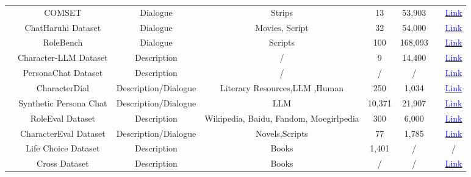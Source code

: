 \begin{table}[!htp]
{{\begin{tabular}{c|c|c|c|c|c|c|c}
\cline{2-8}
   & COMSET & Dialogue & Strips & 13 & 53,903 & \cite{agrawal-etal-2023-multimodal} & \href{https://github.com/dair-iitd/MPdialog}{\textcolor{blue}{Link}} \\
\cline{2-8}
   & ChatHaruhi Dataset & Dialogue & Movies, Script & 32 & 54,000 & \cite{li2023chatharuhirevivinganimecharacter} & \href{https://github.com/LC1332/Chat-Haruhi-Suzumiya}{\textcolor{blue}{Link}} \\
\cline{2-8}
   & RoleBench & Dialogue & Scripts & 100 & 168,093 & \cite{wang2024rolellmbenchmarkingelicitingenhancing} & \href{https://github.com/InteractiveNLP-Team/RoleLLM-public}{\textcolor{blue}{Link}} \\
\cline{2-8}
   & Character-LLM Dataset & Description & /  & 9 & 14,400 & \cite{shao2023characterllmtrainableagentroleplaying} & \href{https://github.com/choosewhatulike/trainable-agents}{\textcolor{blue}{Link}} \\
\cline{2-8}
   & PersonaChat Dataset & Description & /  & /  & /  & \cite{zhang2018personalizingdialogueagentsi} & \href{https://github.com/datasets-mila/datasets--personachat}{\textcolor{blue}{Link}} \\
\cline{2-8}
   & CharacterDial & Description/Dialogue & Literary Resources,LLM ,Human  & 250 & 1,034 & \cite{zhou2023characterglmcustomizingchineseconversational} & \href{https://github.com/thu-coai/CharacterGLM-6B}{\textcolor{blue}{Link}} \\
\cline{2-8}
   & Synthetic Persona Chat & Description/Dialogue & LLM & 10,371 & 21,907 & \cite{jandaghi2023faithfulpersonabasedconversationaldataset} & \href{https://github.com/google-research-datasets/Synthetic-Persona-Chat}{\textcolor{blue}{Link}} \\
\cline{2-8}
   & RoleEval Dataset & Description & Wikipedia, Baidu, Fandom, Moegirlpedia & 300 & 6,000 & \cite{shen2024roleevalbilingualroleevaluation} & \href{https://github.com/Magnetic2014/RoleEval}{\textcolor{blue}{Link}} \\
\cline{2-8}
   & CharacterEval Dataset & Description/Dialogue & Novels,Scripts & 77 & 1,785 & \cite{tu2024characterevalchinesebenchmarkroleplaying} & \href{https://github.com/morecry/CharacterEval}{\textcolor{blue}{Link}} \\
\cline{2-8}
   & Life Choice Dataset & Description & Books & 1,401 & /  & \cite{xu2024characterdestinylargelanguage} & /  \\
\cline{2-8}
   & Cross Dataset & Description & Books & /  & /  & \cite{yuan2024evaluatingcharacterunderstandinglarge} & \href{https://github.com/Joanna0123/character_profiling}{\textcolor{blue}{Link}} \\

\end{tabular}}}
\end{table}
